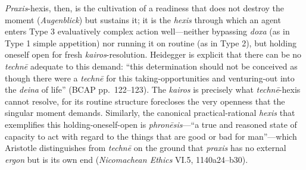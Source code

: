 \documentclass{article}
\begin{document}
\textit{Praxis}-hexis, then, is the cultivation of a readiness that does not destroy the moment (\textit{Augenblick}) but sustains it; it is the \textit{hexis} through which an agent enters Type 3 evaluatively complex action well---neither bypassing \textit{doxa} (as in Type 1 simple appetition) nor running it on routine (as in Type 2), but holding oneself open for fresh \textit{kairos}-resolution. Heidegger is explicit that there can be no \textit{techn\=e} adequate to this demand: ``this determination should not be conceived as though there were a \textit{techn\=e} for this taking-opportunities and venturing-out into the \textit{deina} of life'' (BCAP pp.~122--123). The \textit{kairos} is precisely what \textit{techn\=e}-hexis cannot resolve, for its routine structure forecloses the very openness that the singular moment demands. Similarly, the canonical practical-rational \textit{hexis} that exemplifies this holding-oneself-open is \textit{phron\=esis}---``a true and reasoned state of capacity to act with regard to the things that are good or bad for man''---which Aristotle distinguishes from \textit{techn\=e} on the ground that \textit{praxis} has no external \textit{ergon} but is its own end (\textit{Nicomachean Ethics} VI.5, 1140a24--b30).
\end{document}

